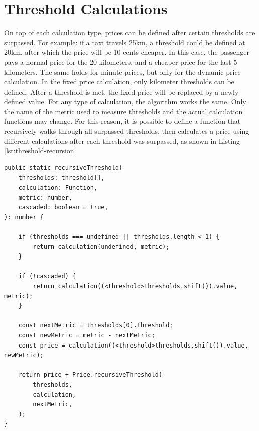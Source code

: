 
\section{Threshold Calculations}
On top of each calculation type, prices can be defined after certain thresholds are surpassed. For example: if a taxi travels 25km, a threshold could be defined at 20km, after which the price will be 10 cents cheaper. In this case, the passenger pays a normal price for the 20 kilometers, and a cheaper price for the last 5 kilometers. The same holds for minute prices, but only for the dynamic price calculation. In the fixed price calculation, only kilometer thresholds can be defined. After a threshold is met, the fixed price will be replaced by a newly defined value. For any type of calculation, the algorithm works the same. Only the name of the metric used to measure thresholds and the actual calculation functions may change. For this reason, it is possible to define a function that recursively walks through all surpassed thresholds, then calculates a price using different calculations after each threshold was surpassed, as shown in Listing \ref{lst:threshold-recursion}

\begin{lstlisting}[caption={Recursive threshold calculation.}, label={lst:threshold-recursion}]
public static recursiveThreshold(
	thresholds: threshold[],
	calculation: Function,
	metric: number,
	cascaded: boolean = true,
): number {

	if (thresholds === undefined || thresholds.length < 1) {
		return calculation(undefined, metric);
	}

	if (!cascaded) {
		return calculation((<threshold>thresholds.shift()).value, metric);
	}

	const nextMetric = thresholds[0].threshold;
	const newMetric = metric - nextMetric;
	const price = calculation((<threshold>thresholds.shift()).value, newMetric);

	return price + Price.recursiveThreshold(
		thresholds,
		calculation,
		nextMetric,
	);
}
\end{lstlisting}


